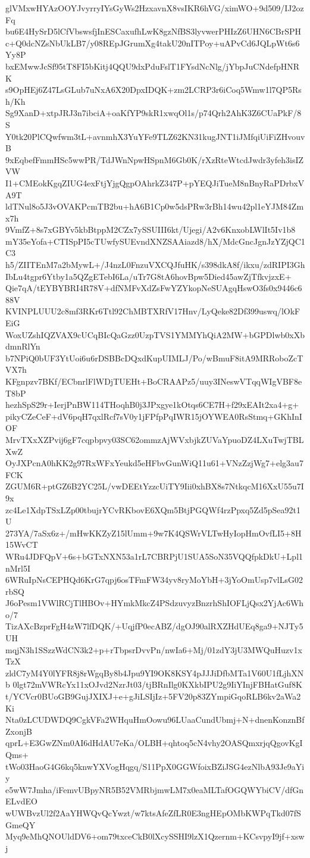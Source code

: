 glVMxwHYAzOOYJvyrryIYsGyWs2HzxavnX8vsIKR6hVG/ximWO+9d509/IJ2ozFq
bu6E4HySrD5lCfVbswsfjInESCaxufhLwK8gzNfBS3lyvwerPHIzZ6UHN6CBrSPH
c+Q0dcNZsNbUkLB7/y08REpJGrumXg4takU20nITPoy+uAPvCd6JQLpWt6s6Yy8P
bxEMwwJcSf95tT8FI5bKitj4QQU9dxPduFslT1FYsdNcNlg/jYbpJuCNdefpHNRK
s9OpHEj6Z47LsGLub7uNxA6X20DpxIDQK+zm2LCRP3r6iCoq5Wmw1l7QP5Rsh/Kh
Sg9XanD+xtpJRJ3n7ibciA+oaKfYP9skR1xwqOl1s/p74Qrh2AhK3Z6CUaPkF/8S
Y0tk20PlCQwfwm3tL+avnmhX3YuYFe9TLZ62KN31kugJNT1iJMfqiUiFiZHvouvB
9xEqbefFmmHSc5wwPR/TdJWnNpwHSpnM6Gb0K/rXzRteWtcdJwdr3yfeh3isIZVW
I1+CMEokKgqZIUG4exFtjYjgQgpOAhrkZ347P+pYEQJiTueM8nBnyRaPDrbxVA9T
ldTNul8o5J3vOVAKPcmTB2bu+hA6B1Cp0w5dsPRw3rBh14wu42pl1eYJM84Zmx7h
9VmfZ+8s7xGBYv5kbBtppM2CZx7ySSUIII6kt/Ujegi/A2v6KnxobLWlIt5Iv1b8
mY35eYofa+CTISpPI5cTUwfySUEvndXNZSAAiazd8/hX/MdcGncJgnJzYZjQC1C3
h5/ZIITEnM7a2bMywL+/J4nzL0FnzuVXCQJfuHK/s398dkA8f/ikxu/zdRIPI3Gh
IbLu4tgpr6Ytby1a5QZgETebI6La/uTr7G8tA6hovBpw5Died45awZjTfkvjzxE+
Qie7qA/tEYBYBRI4R78V+dfNMFvXdZsFwYZYkopNeSUAgqHswO3fs0x9446c688V
KVINPLUUU2c8mf3RKr6Ttl92ChMBTXRfV17Hnv/LyQeke82Df399uswq/lOkFEiG
WoxUZshIQZVAX9cUCqBIcQaGzz0UzpTVS1YMMYhQiA2MW+bGPDlwb0xXbdmnRlYn
b7NPiQ0bUF3YtUoi6u6rDSBBcDQxdKupUIMLJ/Po/wBmuF8itA9MRRoboZcTVX7h
KFgnpzv7BKf/ECbnrlFlWDjTUEHt+BoCRAAPz5/uuy3INeswVTqqWIgVBF8eT8bP
hezhSpS29r+IerjPnBW114THoqhB0j3JPxgye1kOtqs6CE7H+f29xEAIt2xa4+g+
pikyCZeCeF+dV6pqH7qxlRcf7sV0y1jFPfpPqIWR15jOYWEA0RsStmq+GKhInIOF
MrvTXxXZPvij6gF7cqpbpvy03SC62ommzAjWVxbjkZUVaYpuoDZ4LXuTwjTBLXwZ
OyJXPcnA0hKK2g97RxWFxYeukd5eHFbvGunWiQ11u61+VNzZzjWg7+elg3au7FCK
ZGUM6R+ptGZ6B2YC25L/vwDEEtYzzcUiTY9Iii0xhBX8s7NtkqcM16XxU55u7I9x
zc4Le1XdpTSxLZp00tbujrYCvRKbovE6XQm5BtjPGQWf4rzPpxq5Zd5pSea92t1U
273YA/7aSx6z+/mHwKKZyZ15lUmm+9w7K4QSWrVLTwHyIopHmOvfLI5+8H15WvCT
WRu4JDFQpV+6s+bGTxNXN53a1rL7CBRPjU1SUA5SoN35VQQfpkDkU+Lpl1nMrl5I
6WRuIpNsCEPHQd6KrG7qpj6osTFmFW34yv8ryMoYbH+3jYoOmUsp7vlLsG02rbSQ
J6oPesm1VWlRCjTlHBOv+HYmkMkcZ4PSdzuvyzBnzrhShIOFLjQsx2YjAc6Who/7
TizAXcBzprFgH4zW7lfDQK/+UqjfP0ecABZ/dgOJ90alRXZHdUEq8ga9+NJTy5UH
mqjN3h1SSzzWdCN3k2+p+rTbpsrDvvPn/nwIa6+Mj/01zdY3jU3MWQuHuzv1xTzX
zldC7yM4Y0lYFR8j8rWgqBy8b4Jpu9YI9OK8KSY4pJJJiDfbMTa1V60U1fLjhXNb
0lgt72mVWRcYx11xOJvd2NzrJt03/tjBRnIlg0KXkbIPU2g9IiYInjFBHatGuf8K
t/YCVcr0BUoGB9GujJXIXJ+e+gJiLSIjIz+5FV20p83ZYmpiGqoRLB6kv2aWa2Ki
Nta0zLCUDWDQ9CgkVFa2WHquHmOowu96LUaaCundUbmj+N+dnenKonznBfZxonjB
qprL+E3GwZNm0AI6dHdAU7eKa/OLBH+qhtoq5cN4vhy2OASQmxrjqQgovKgIQms+
tWo03HaoG4G6kq5knwYXVogHqgq/S11PpX0GGWfoixBZiJSG4ezNlbA93Je9aYiy
e5wW7Jmha/iFemvUBpyNR5B52VMRbjmwLM7x0eaMLTafOGQWYbiCV/dfGnELvdEO
wUWBvzUl2f2AaYHWQvQcYwzt/w7ktsAfeZfLR0E3ngHEpOMbKWPqTkd07fSGmeQY
Myq9eMhQNOUldDV6+om79txceCkB0lXcySSHI9lzX1Qzernm+KCsvpyI9jf+xswj
